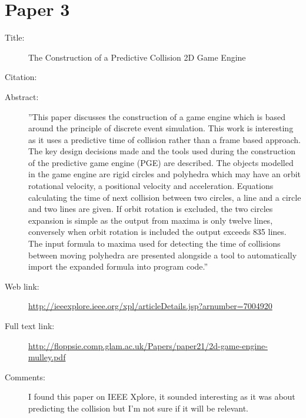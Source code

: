 \documentclass{scrartcl}
\begin{document}
\section*{Paper 3}
\begin{description}
\item[Title:] The Construction of a Predictive Collision 2D Game Engine
\item[Citation:] \cite{Mulley}
\item[Abstract:] ''This paper discusses the construction of a game engine which is based around the principle of discrete event simulation. This work is interesting as it uses a predictive time of collision rather than a frame based approach. The key design decisions made and the tools used during the construction of the predictive game engine (PGE) are described. The objects modelled in the game engine are rigid circles and polyhedra which may have an orbit rotational velocity, a positional velocity and acceleration. Equations calculating the time of next collision between two circles, a line and a circle and two lines are given. If orbit rotation is excluded, the two circles expansion is simple as the output from maxima is only twelve lines, conversely when orbit rotation is included the output exceeds 835 lines. The input formula to maxima used for detecting the time of collisions between moving polyhedra are presented alongside a tool to automatically import the expanded formula into program code.''
\item[Web link:] \url{http://ieeexplore.ieee.org/xpl/articleDetails.jsp?arnumber=7004920}
\item[Full text link:] \url{http://floppsie.comp.glam.ac.uk/Papers/paper21/2d-game-engine-mulley.pdf}
\item[Comments:] I found this paper on IEEE Xplore, it sounded interesting as it was about predicting the collision but I'm not sure if it will be relevant. 
\end{description}
\end{document}

